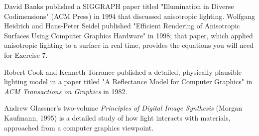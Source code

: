 \documentclass[../main.tex]{subfiles}
\begin{document}
David Banks published a SIGGRAPH paper titled "Illumination in Diverse Codimensions" (ACM Press) in 1994 that discussed anisotropic lighting. Wolfgang Heidrich and Hans-Peter Seidel published "Efficient Rendering of Anisotropic Surfaces Using Computer Graphics Hardware" in 1998; that paper, which applied anisotropic lighting to a surface in real time, provides the equations you will need for Exercise 7.

Robert Cook and Kenneth Torrance published a detailed, physically plausible lighting model in a paper titled "A Reflectance Model for Computer Graphics" in \textit{ACM Transactions on Graphics} in 1982.

Andrew Glassner's two-volume \textit{Principles of Digital Image Synthesis} (Morgan Kaufmann, 1995) is a detailed study of how light interacts with materials, approached from a computer graphics viewpoint.
\end{document}
